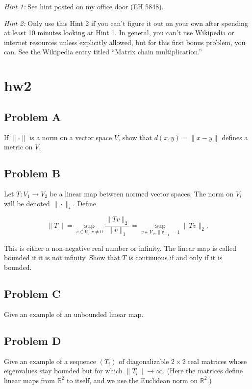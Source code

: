 \documentclass[lang=en,11pt]{template}
\begin{document}
\textit{Hint 1:} See hint posted on my office door (EH 5848).

\textit{Hint 2:} Only use this Hint 2 if you can’t figure it out on your own after spending at least 10 minutes looking at Hint 1. In general, you can’t use Wikipedia or internet resources unless explicitly allowed, but for this first bonus problem, you can. See the Wikipedia entry titled “Matrix chain multiplication.”





\chapter{hw2}

\section*{Problem A}
If \( \|\cdot\| \) is a norm on a vector space \( V \), show that \( d(x, y) = \|x - y\| \) defines a metric on \( V \).

\section*{Problem B}
Let \( T: V_1 \to V_2 \) be a linear map between normed vector spaces. The norm on \( V_i \) will be denoted \( \|\cdot\|_i \). Define

\[
\|T\| = \sup_{v \in V_1, v \neq 0} \frac{\|T v\|_2}{\|v\|_1} = \sup_{v \in V_1, \|v\|_1 = 1} \|T v\|_2.
\]

This is either a non-negative real number or infinity. The linear map is called bounded if it is not infinity. Show that \( T \) is continuous if and only if it is bounded.

\section*{Problem C}
Give an example of an unbounded linear map.

\section*{Problem D}
Give an example of a sequence \( (T_i) \) of diagonalizable \( 2 \times 2 \) real matrices whose eigenvalues stay bounded but for which \( \|T_i\| \to \infty \). (Here the matrices define linear maps from \( \mathbb{R}^2 \) to itself, and we use the Euclidean norm on \( \mathbb{R}^2 \).)
\end{document}
